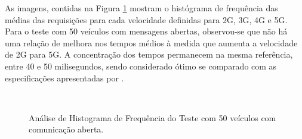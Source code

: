 \documentclass[
	12pt,				%
	oneside,			%
	a4paper,			%
	english,			%
	brazil				%
	]{abntex2ppgsi}
\begin{document}
As imagens, contidas na Figura \ref{fig:imgHistFreq50} mostram o histógrama de frequência das médias das requisições para cada velocidade definidas para 2G, 3G, 4G e 5G. Para o teste com 50 veículos com mensagens abertas, observou-se que não há uma relação de melhora nos tempos médios à medida que aumenta a velocidade de 2G para 5G.  A concentração dos tempos permanecem na mesma referência, entre 40 e 50 milisegundos, sendo considerado ótimo se comparado com as especificações apresentadas por .

\begin{figure}[h!]
	\caption{Análise de Histograma de Frequência do Teste  com 50 veículos com comunicação aberta.}
	\centering
	\label{fig:imgHistFreq50}
	\\
\end{figure}
\end{document}
